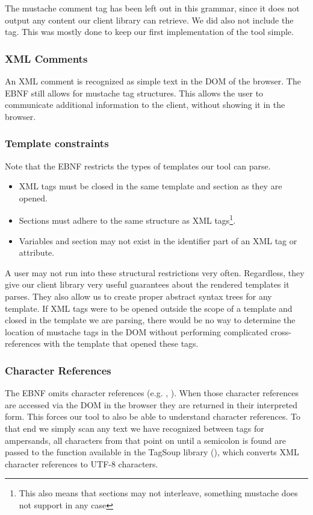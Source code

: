 \documentclass[thesis.tex]{subfiles}
\begin{document}
The mustache comment tag has been left out in this grammar, since it does not
output any content our client library can retrieve. We did also not include the
 tag. This was mostly done to keep our first
implementation of the tool simple.

\subsubsection{XML Comments}
An XML comment is recognized as simple text in the DOM of the browser. The EBNF
still allows for mustache tag structures. This allows the user to communicate
additional information to the client, without showing it in the browser.

\subsubsection{Template constraints}
\label{sec:template-constraints}
Note that the EBNF restricts the types of
templates our tool can parse.

\begin{itemize}
\item XML tags must be closed in the same template and section as they are opened.
\item Sections must adhere to the same structure as XML tags\footnote{
      This also means that sections may not interleave, something mustache
      does not support in any case}.
\item Variables and section may not exist in the identifier part of an XML tag
      or attribute.
\end{itemize}

A user may not run into these structural restrictions very often. Regardless,
they give our client library very useful guarantees about the rendered templates
it parses. They also allow us to create proper abstract syntax trees for any
template.
If XML tags were to be opened outside the scope of a template
and closed in the template we are parsing, there would be no way to determine
the location of mustache tags in the DOM without performing complicated
cross-references with the template that opened these tags.

\subsubsection{Character References}
The EBNF omits character references (e.g. , ).
When those character references are accessed via the DOM in the browser they are
returned in their interpreted form. This forces our tool to also be able to
understand character references. To that end we simply scan any text we have
recognized between tags for ampersands, all characters from that point on until
a semicolon is found are passed to the  function available
in the TagSoup library (), which converts
XML character references to UTF-8 characters.
\end{document}
